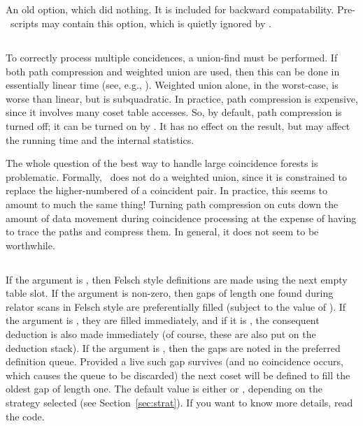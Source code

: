 \subsection{}

An old option, which did nothing.
It is included for backward compatability.
Pre-\acet\ scripts may contain this option, which is quietly ignored
  by \acet.

\subsection{}

To correctly process multiple concidences, a union-find must be performed.
If both path compression and weighted union are used, then this can be
  done in essentially linear time (see, e.g., \cite{CLR90}).
Weighted union alone, in the worst-case, is worse than linear, but is
  subquadratic.
In practice, path compression is expensive, since it involves many coset
  table accesses.
So, by default, path compression is turned off; it can be turned on by
  .
It has no effect on the result, but may affect the running time and the
  internal statistics.

The whole question of the best way to handle large coincidence forests is
  problematic.
Formally, \ace\ does not do a weighted union, since it is constrained to
  replace the higher-numbered of a coincident pair.
In practice, this seems to amount to much the same thing!
Turning path compression on cuts down the amount of data movement during
  coincidence processing at the expense of having to trace the paths and
  compress them.
In general, it does not seem to be worthwhile.

\subsection{}

If the argument is , then Felsch style definitions are made using
  the next empty table slot.
If the argument is non-zero, then gaps of length one found during relator
  scans in Felsch style are preferentially filled (subject to the value
  of ).
If the argument is , they are filled immediately, and if it is
  , the consequent deduction is also made immediately (of course,
  these are also put on the deduction stack).  
If the argument is , then the gaps are noted in the preferred
  definition queue.  
Provided a live such gap survives (and no coincidence occurs, which causes
  the queue to be discarded) the next coset will be defined to fill the
  oldest gap of length one.
The default value is either  or , depending on the strategy
  selected (see Section~\ref{sec:strat}).
If you want to know more details, read the code.

